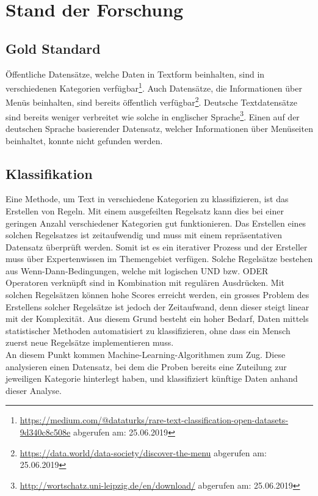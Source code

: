 \chapter{Stand der Forschung}
\section{Gold Standard}
Öffentliche Datensätze, welche Daten in Textform beinhalten, sind in verschiedenen Kategorien verfügbar\footnote{\url{https://medium.com/@dataturks/rare-text-classification-open-datasets-9d340c8c508e} abgerufen am: 25.06.2019}.
Auch Datensätze, die Informationen über Menüs beinhalten, sind bereits öffentlich verfügbar\footnote{\url{https://data.world/data-society/discover-the-menu} abgerufen am: 25.06.2019}.
Deutsche Textdatensätze sind bereits weniger verbreitet wie solche in englischer Sprache\footnote{\url{http://wortschatz.uni-leipzig.de/en/download/} abgerufen am: 25.06.2019}.
Einen auf der deutschen Sprache basierender Datensatz, welcher Informationen über Menüseiten beinhaltet, konnte nicht gefunden werden.
\section{Klassifikation}
Eine Methode, um Text in verschiedene Kategorien zu klassifizieren, ist das Erstellen von Regeln.
Mit einem ausgefeilten Regelsatz kann dies bei einer geringen Anzahl verschiedener Kategorien gut funktionieren.
Das Erstellen eines solchen Regelsatzes ist zeitaufwendig und muss mit einem repräsentativen Datensatz überprüft werden.
Somit ist es ein iterativer Prozess und der Ersteller muss über Expertenwissen im Themengebiet verfügen.
Solche Regelsätze bestehen aus \glqq Wenn-Dann\grqq-Bedingungen, welche mit logischen \glqq UND\grqq{} bzw. \glqq ODER\grqq{} Operatoren verknüpft sind in Kombination mit regulären Ausdrücken.
Mit solchen Regelsätzen können hohe Scores erreicht werden, ein grosses Problem des Erstellens solcher Regelsätze ist jedoch der Zeitaufwand, denn dieser steigt linear mit der Komplexität.
Aus diesem Grund besteht ein hoher Bedarf, Daten mittels statistischer Methoden automatisiert zu klassifizieren, ohne dass ein Mensch zuerst neue Regelsätze implementieren muss.\\
An diesem Punkt kommen Machine-Learning-Algorithmen zum Zug.
Diese analysieren einen Datensatz, bei dem die Proben bereits eine Zuteilung zur jeweiligen Kategorie hinterlegt haben, und klassifiziert künftige Daten anhand dieser Analyse. \cite[p. 125-127]{jackson2007natural}
